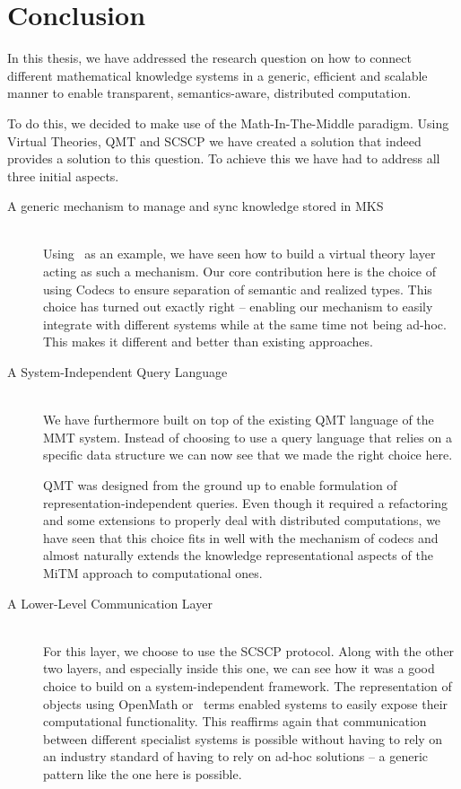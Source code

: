 \section{Conclusion}\label{sec:conclusion}

In this thesis, we have addressed the research question on how to connect different mathematical knowledge systems
in a generic, efficient and scalable manner to enable transparent, semantics-aware, distributed computation. 

To do this, we decided to make use of the Math-In-The-Middle paradigm. 
Using Virtual Theories, QMT and SCSCP we have created a solution that indeed provides a solution to this question. 
To achieve this we have had to address all three initial aspects. 

\begin{description}
  \item[A generic mechanism to manage and sync knowledge stored in MKS]\quad\\
    Using \lmfdb\ as an example, we have seen how to build a virtual theory layer acting as such a mechanism.  
    Our core contribution here is the choice of using Codecs to ensure separation of semantic and realized types. 
    This choice has turned out exactly right -- enabling our mechanism to easily integrate with different systems while at the same time not being ad-hoc. 
    This makes it different and better than existing approaches. 
    
  \item[A System-Independent Query Language]\quad\\
    We have furthermore built on top of the existing QMT language of the MMT system. 
    Instead of choosing to use a query language that relies on a specific data structure we can now see that we made the right choice here. 
    
    QMT was designed from the ground up to enable formulation of representation-independent queries. 
    Even though it required a refactoring and some extensions to properly deal with distributed computations, we have seen that this choice fits in well with the mechanism of codecs and almost naturally extends the knowledge representational aspects of the MiTM approach to computational ones. 
  
  \item[A Lower-Level Communication Layer] \quad\\
    For this layer, we choose to use the SCSCP protocol. 
    Along with the other two layers, and especially inside this one, we can see how it was a good choice to build on a system-independent framework. 
    The representation of objects using OpenMath or \omdocmmt\ terms enabled systems to easily expose their computational functionality. 
    This reaffirms again that communication between different specialist systems is possible without having to rely on an industry standard of having to rely on ad-hoc solutions -- a generic pattern like the one here is possible. 
\end{description}

